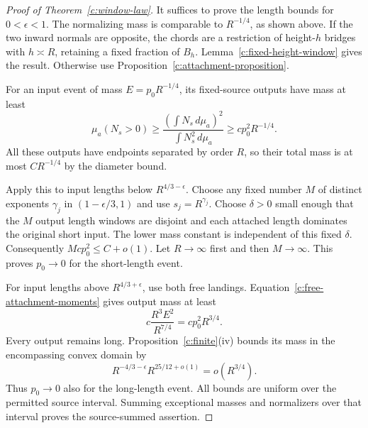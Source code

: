 \begin{proof}[Proof of Theorem~\ref{c:window-law}]
It suffices to prove the length bounds for $0<\epsilon<1$.
The normalizing mass is comparable to $R^{-1/4}$, as shown above.
If the two inward normals are opposite, the chords are a restriction
of height-$h$ bridges with $h\asymp R$, retaining a fixed fraction of
$B_h$. Lemma~\ref{c:fixed-height-window} gives the result. Otherwise
use Proposition~\ref{c:attachment-proposition}.

For an input event of mass $E=p_0R^{-1/4}$, its fixed-source outputs
have mass at least
\[
 \mu_a(N_s>0)\ge
 \frac{(\int N_s\,d\mu_a)^2}{\int N_s^2\,d\mu_a}
 \ge cp_0^2R^{-1/4}.
\]
All these outputs have endpoints separated by order $R$, so their
total mass is at most $CR^{-1/4}$ by the diameter bound.

Apply this to input lengths below $R^{4/3-\epsilon}$. Choose any fixed
number $M$ of distinct exponents $\gamma_j$ in
$(1-\epsilon/3,1)$ and use $s_j=R^{\gamma_j}$. Choose $\delta>0$
small enough that the $M$ output length windows are disjoint and each
attached length dominates the original short input. The lower mass
constant is independent of this fixed $\delta$. Consequently
$Mcp_0^2\le C+o(1)$. Let $R\to\infty$ first and then $M\to\infty$.
This proves $p_0\to0$ for the short-length event.

For input lengths above $R^{4/3+\epsilon}$, use both free landings.
Equation~\eqref{c:free-attachment-moments} gives output mass at least
\[
 c\frac{R^3E^2}{R^{7/4}}=cp_0^2R^{3/4}.
\]
Every output remains long. Proposition~\ref{c:finite}(iv) bounds its
mass in the encompassing convex domain by
\[
 R^{-4/3-\epsilon}R^{25/12+o(1)}=o(R^{3/4}).
\]
Thus $p_0\to0$ also for the long-length event. All bounds are uniform
over the permitted source interval. Summing exceptional masses and
normalizers over that interval proves the source-summed assertion.
\end{proof}
